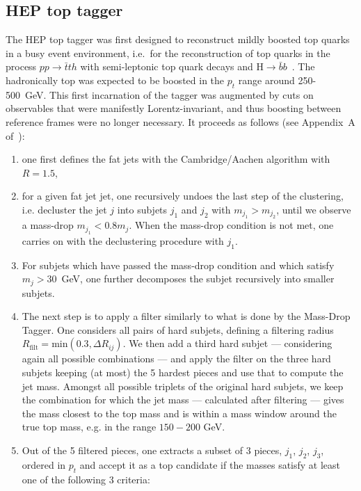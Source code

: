 \subsection{HEP top tagger}

The HEP top tagger was first designed to reconstruct mildly boosted
top quarks in a busy event environment, i.e.\ for the reconstruction
of top quarks in the process $pp \to \bar{t} t h$ with semi-leptonic
top quark decays and $\text{H} \to \bar{b}b$~\cite{Plehn:2009rk}. The
hadronically top was expected to be boosted in the $p_t$ range around
250-500~GeV. This first incarnation of the tagger was augmented by
cuts on observables that were manifestly Lorentz-invariant, and thus
boosting between reference frames were no longer necessary. It
proceeds as follows (see Appendix~A of~\cite{Plehn:2010st}): 
\begin{enumerate}
\item one first defines the fat jets with the Cambridge/Aachen
  algorithm with $R=1.5$,
%
\item for a given fat jet jet, one recursively undoes the last step of
  the clustering, i.e. decluster the jet $j$ into subjets $j_1$ and
  $j_2$ with $m_{j_1}>m_{j_2}$, until we observe a mass-drop
  $m_{j_1}<0.8 m_{j}$. When the mass-drop condition is not met, one
  carries on with the declustering procedure with $j_1$.
%
\item For subjets which have passed the mass-drop condition and which
  satisfy $m_j>30$~GeV, one further decomposes the subjet recursively
  into smaller subjets.
%
\item The next step is to apply a filter similarly to what is done by
  the Mass-Drop Tagger. One considers all pairs of hard subjets,
  defining a filtering radius
  $R_{\text{filt}}=\text{min}(0.3,\Delta R_{ij})$. We then add a third
  hard subjet --- considering again all possible combinations --- and apply
  the filter on the three hard subjets keeping (at most) the 5 hardest
  pieces and use that to compute the jet mass.
  Amongst all possible triplets of the original hard subjets, we keep
  the combination for which the jet mass --- calculated after
  filtering --- gives the mass closest to the top mass and is within a mass window around the true top mass, e.g. in the range $150-200$ GeV.
\item Out of the 5 filtered pieces, one extracts a subset of 3
  pieces, $j_1$, $j_2$, $j_3$, ordered in $p_t$ and accept it as a
  top candidate if the masses satisfy at least one of the following
  3 criteria:

\end{enumerate}
